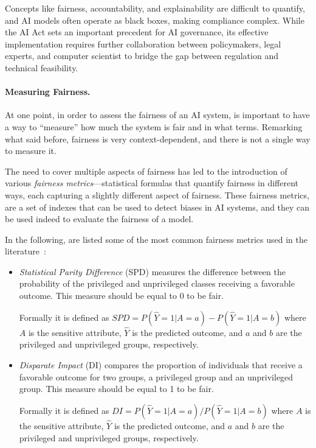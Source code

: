 \documentclass[12pt,a4paper,openright,twoside]{book}
\begin{document}
Concepts like fairness, accountability, and explainability are difficult to quantify, and AI models often operate as black boxes, making compliance complex.
%
While the AI Act sets an important precedent for AI governance, its effective implementation requires further collaboration between policymakers, legal experts, and computer scientist to bridge the gap between regulation and technical feasibility.


\paragraph{Measuring Fairness.}

At one point, in order to assess the fairness of an \ac{AI} system, is important to have a way to ``measure'' how much the system is fair and in what terms.
%
Remarking what said before, fairness is very context-dependent, and there is not a single way to measure it. 


The need to cover multiple aspects of fairness has led to the introduction of various \textit{fairness metrics}---statistical formulas that quantify fairness in different ways, each capturing a slightly different aspect of fairness.
%
These fairness metrics, are a set of indexes that can be used to detect biases in \ac{AI} systems, and they can be used indeed to evaluate the fairness of a model.
%


In the following, are listed some of the most common fairness metrics used in the literature~\cite{DBLP:conf/bias/IrfanML23}:

\begin{itemize}
    \item \textit{Statistical Parity Difference} (SPD) measures the difference between the probability of the privileged and unprivileged classes receiving a favorable outcome. This measure should be equal to 0 to be fair.
    
    Formally it is defined as $SPD = P(\hat{Y} = 1 | A = a) - P(\hat{Y} = 1 | A = b)$
    where $A$ is the sensitive attribute, $\hat{Y}$ is the predicted outcome, and $a$ and $b$ are the privileged and unprivileged groups, respectively.
    
    \item \textit{Disparate Impact} (DI) compares the proportion of individuals that receive a favorable outcome for two groups, a privileged group and an unprivileged group. This measure should be equal to 1 to be fair.
    
    Formally it is defined as $DI = P(\hat{Y} = 1 | A = a) / P(\hat{Y} = 1 | A = b)$
    where $A$ is the sensitive attribute, $\hat{Y}$ is the predicted outcome, and $a$ and $b$ are the privileged and unprivileged groups, respectively.
    
\end{itemize}
\end{document}
